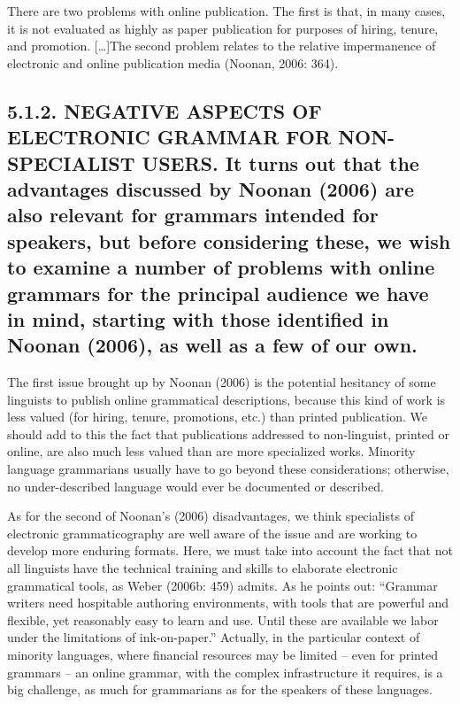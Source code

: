 \documentclass[letterpaper]{article}
\begin{document}
There are two problems with online publication. The first is that, in many cases, it is not evaluated as highly as paper publication for purposes of hiring, tenure, and promotion. [{\dots}]The second problem relates to the relative impermanence of electronic and online publication media (Noonan, 2006: 364).

\subsection[5.1.2. NEGATIVE ASPECTS OF ELECTRONIC GRAMMAR FOR NON{}-SPECIALIST USERS. \ It turns out that the advantages discussed by Noonan (2006) are also relevant for grammars intended for speakers, but before considering these, we wish to examine a number of problems with online grammars for the principal audience we have in mind, starting with those identified in Noonan (2006), as well as a few of our own.]{5.1.2. NEGATIVE ASPECTS OF ELECTRONIC GRAMMAR FOR NON-SPECIALIST USERS.  \textmd{It turns out that the advantages }\textmd{discussed }\textmd{by Noonan}\textmd{ (2006)}\textmd{ are also relevant for grammars}\textmd{ intended for speakers}\textmd{, but before considering these, we }\textmd{wish to }\textmd{examine }\textmd{a number of }\textmd{problems }\textmd{with }\textmd{online grammars for the principal audience we }\textmd{have }\textmd{in mind, starting with }\textmd{those identified in }\textmd{Noonan}\textmd{ (2006)}\textmd{, as well as a few}\textmd{ of our own}\textmd{.}}
The first issue brought up by Noonan (2006) is the potential hesitancy of some linguists to publish online grammatical descriptions, because this kind of work is less valued (for hiring, tenure, promotions, etc.) than printed publication. We should add to this the fact that publications addressed to non-linguist, printed or online, are also much less valued than are more specialized works. Minority language grammarians usually have to go beyond these considerations; otherwise, no under{}-described language would ever be documented or described. 

As for the second of Noonan{\textquoteright}s (2006) disadvantages, we think specialists of electronic grammaticography are well aware of the issue and are working to develop more enduring formats. Here, we must take into account the fact that not all linguists have the technical training and skills to elaborate electronic grammatical tools, as Weber (2006b: 459) admits. As he points out: {\textquotedblleft}Grammar writers need hospitable authoring environments, with tools that are powerful and flexible, yet reasonably easy to learn and use. Until these are available we labor under the limitations of ink-on-paper.{\textquotedblright} Actually, in the particular context of minority languages, where financial resources may be limited -- even for printed grammars -- an online grammar, with the complex infrastructure it requires, is a big challenge, as much for grammarians as for the speakers of these languages.
\end{document}
